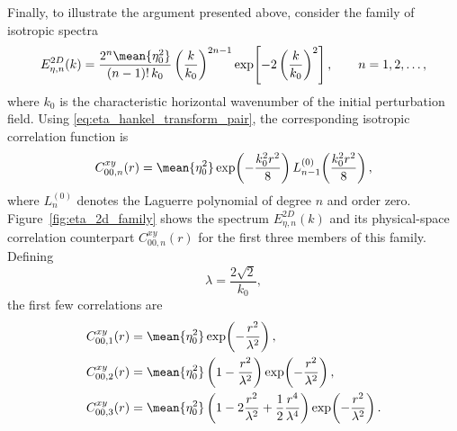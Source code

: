 Finally, to illustrate the argument presented above, consider the family of isotropic spectra
\begin{equation}
    E_{\eta,n}^{2D}(k)
    =
    \frac{2^n\mean{\eta_0^2}}{(n-1)!\,k_0}
    \left(\frac{k}{k_0}\right)^{2n-1}
    \exp\!\left[
        -2\left(\frac{k}{k_0}\right)^2
    \right],
    \qquad n=1,2,\ldots ,
    \label{eq:eta_spectrum_family}
\end{equation}
where \(k_0\) is the characteristic horizontal wavenumber of the initial perturbation field. Using \eqref{eq:eta_hankel_transform_pair}, the corresponding isotropic correlation function is
\begin{equation}
    C_{00,n}^{xy}(r)
    =
    \mean{\eta_0^2}
    \exp\!\left(-\frac{k_0^2 r^2}{8}\right)
    L_{n-1}^{(0)}
    \!\left(
        \frac{k_0^2 r^2}{8}
    \right),
    \label{eq:eta_correlation_family}
\end{equation}
where \(L_n^{(0)}\) denotes the Laguerre polynomial of degree \(n\) and order zero. Figure~\ref{fig:eta_2d_family} shows the spectrum \(E_{\eta,n}^{2D}(k)\) and its physical-space correlation counterpart \(C_{00,n}^{xy}(r)\) for the first three members of this family. Defining
\begin{equation}
    \lambda = \frac{2\sqrt{2}}{k_0},
    \label{eq:lambda_k0_relation}
\end{equation}
the first few correlations are
\begin{equation}
\begin{aligned}
    C_{00,1}^{xy}(r)
    &=
    \mean{\eta_0^2}
    \exp\!\left(-\frac{r^2}{\lambda^2}\right),
    \\
    C_{00,2}^{xy}(r)
    &=
    \mean{\eta_0^2}
    \left(
        1-\frac{r^2}{\lambda^2}
    \right)
    \exp\!\left(-\frac{r^2}{\lambda^2}\right),
    \\
    C_{00,3}^{xy}(r)
    &=
    \mean{\eta_0^2}
    \left(
        1
        -
        2\frac{r^2}{\lambda^2}
        +
        \frac{1}{2}\frac{r^4}{\lambda^4}
    \right)
    \exp\!\left(-\frac{r^2}{\lambda^2}\right).
\end{aligned}
\label{eq:eta_correlation_family_examples}
\end{equation}

